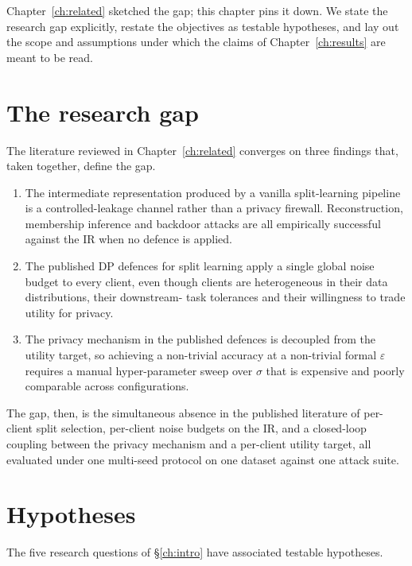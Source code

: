 \documentclass[11pt,a4paper,oneside]{report}
\begin{document}
Chapter~\ref{ch:related} sketched the gap; this chapter pins it down.
We state the research gap explicitly, restate the objectives as
testable hypotheses, and lay out the scope and assumptions under
which the claims of Chapter~\ref{ch:results} are meant to be read.

\section{The research gap}

The literature reviewed in Chapter~\ref{ch:related} converges on
three findings that, taken together, define the gap.

\begin{enumerate}[label=(\arabic*),itemsep=2pt]
 \item The intermediate representation produced by a vanilla
 split-learning pipeline is a controlled-leakage channel rather
 than a privacy firewall. Reconstruction, membership inference
 and backdoor attacks are all empirically successful against
 the IR when no defence is applied.
 \item The published DP defences for split learning apply a single
 global noise budget to every client, even though clients are
 heterogeneous in their data distributions, their downstream-
 task tolerances and their willingness to trade utility for
 privacy.
 \item The privacy mechanism in the published defences is decoupled
 from the utility target, so achieving a non-trivial accuracy
 at a non-trivial formal $\varepsilon$ requires a manual
 hyper-parameter sweep over $\sigma$ that is expensive and
 poorly comparable across configurations.
\end{enumerate}

The gap, then, is the simultaneous absence in the published
literature of per-client split selection, per-client noise budgets on
the IR, and a closed-loop coupling between the privacy mechanism and
a per-client utility target, all evaluated under one multi-seed
protocol on one dataset against one attack suite.

\section{Hypotheses}

The five research questions of \S\ref{ch:intro} have associated
testable hypotheses.
\end{document}
